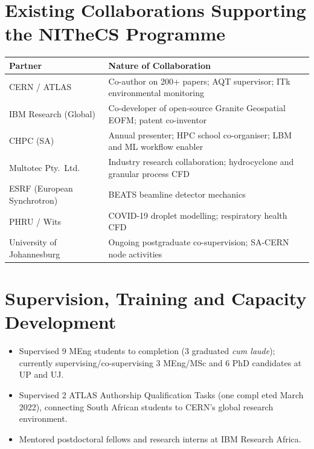 \documentclass[11pt,a4paper]{article}
\begin{document}
\newpage

\section{Existing Collaborations Supporting the NITheCS Programme}

\begin{tabularx}{\linewidth}{lX}
\toprule
\textbf{Partner} & \textbf{Nature of Collaboration} \\
\midrule
CERN / ATLAS & Co-author on 200+ papers; AQT supervisor; ITk environmental monitoring \\
IBM Research (Global) & Co-developer of open-source Granite Geospatial EOFM; patent co-inventor \\
CHPC (SA) & Annual presenter; HPC school co-organiser; LBM and ML workflow enabler \\
Multotec Pty.\ Ltd. & Industry research collaboration; hydrocyclone and granular process CFD \\
ESRF (European Synchrotron) & BEATS beamline detector mechanics \\
PHRU / Wits & COVID-19 droplet modelling; respiratory health CFD \\
University of Johannesburg & Ongoing postgraduate co-supervision; SA-CERN node activities \\
\bottomrule
\end{tabularx}

\section{Supervision, Training and Capacity Development}

\begin{itemize}
  \item Supervised 9 MEng students to completion (3 graduated \textit{cum laude}); currently supervising/co-supervising 3 MEng/MSc and 6 PhD candidates at UP and UJ.
  \item Supervised 2 ATLAS Authorship Qualification Tasks (one compl
  eted March 2022), connecting South African students to CERN's global research environment.
  \item Mentored postdoctoral fellows and research interns at IBM Research Africa.
\end{itemize}

\end{document}
